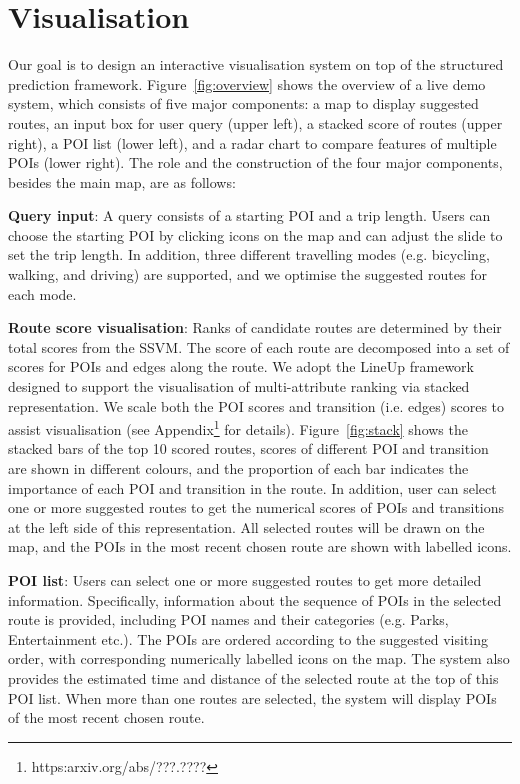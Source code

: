 \section{Visualisation}
Our goal is to design an interactive visualisation system on top of the structured prediction framework.
Figure~\ref{fig:overview} shows the overview of a live demo system, which consists of five major components: a map to display suggested routes, an input box for user query (upper left), a stacked score of routes (upper right), a POI list (lower left), and a radar chart to compare features of multiple POIs (lower right). 
The role and the construction of the four major components, besides the main map, are as follows:

\textbf{Query input}: A query consists of a starting POI and a trip length. 
Users can choose the starting POI by clicking icons on the map and can adjust the slide to set the trip length. 
In addition, three different travelling modes (e.g. bicycling, walking, and driving) are supported, 
and we optimise the suggested routes for each mode.

\textbf{Route score visualisation}: Ranks of candidate routes are determined by their total scores from the SSVM. 
The score of each route are decomposed into a set of scores for POIs and edges along the route. 
We adopt the LineUp framework~\cite{gratzl2013lineup} designed to support the visualisation of multi-attribute ranking via stacked representation. 
We scale both the POI scores and transition (i.e. edges) scores to assist visualisation (see Appendix\footnote{https:arxiv.org/abs/???.????} for details).
Figure~\ref{fig:stack} shows the stacked bars of the top 10 scored routes, 
scores of different POI and transition are shown in different colours,
and the proportion of each bar indicates the importance of each POI and transition in the route.
In addition, user can select one or more suggested routes to get the numerical scores of POIs and transitions at the left side of this representation.
All selected routes will be drawn on the map, and the POIs in the most recent chosen route are shown with labelled icons.

\textbf{POI list}:
Users can select one or more suggested routes to get more detailed information. 
Specifically, information about the sequence of POIs in the selected route is provided, including POI names and their categories (e.g. Parks, Entertainment etc.).
The POIs are ordered according to the suggested visiting order, with corresponding numerically labelled icons on the map.
The system also provides the estimated time and distance of the selected route at the top of this POI list.
When more than one routes are selected, the system will display POIs of the most recent chosen route.

